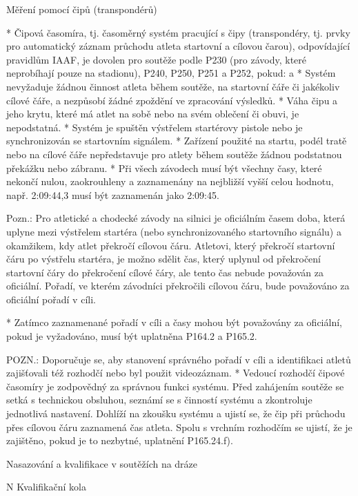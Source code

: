 Měření pomocí čipů (transpondérů)

* Čipová časomíra, tj. časoměrný systém pracující s čipy (transpondéry, tj. prvky pro automatický záznam průchodu atleta startovní a cílovou čarou), odpovídající pravidlům IAAF, je dovolen pro soutěže podle P230 (pro závody, které neprobíhají pouze na stadionu), P240, P250, P251 a P252, pokud:
  \begitems \style a
  * Systém nevyžaduje žádnou činnost atleta během soutěže, na startovní čáře či jakékoliv cílové čáře, a nezpůsobí žádné zpoždění ve zpracování výsledků.
  * Váha čipu a jeho krytu, které má atlet na sobě nebo na svém oblečení či obuvi, je nepodstatná.
  * Systém je spuštěn výstřelem startérovy pistole nebo je synchronizován se startovním signálem.
  * Zařízení použité na startu, podél tratě nebo na cílové čáře nepředstavuje pro atlety během soutěže žádnou podstatnou překážku nebo zábranu.
  * Při všech závodech musí být všechny časy, které nekončí nulou, zaokrouhleny a zaznamenány na nejbližší vyšší celou hodnotu, např. 2:09:44,3 musí být zaznamenán jako 2:09:45.

  Pozn.: Pro atletické a chodecké závody na silnici je oficiálním časem doba, která uplyne mezi výstřelem startéra (nebo synchronizovaného startovního signálu) a okamžikem, kdy atlet překročí cílovou čáru. Atletovi, který překročí startovní čáru po výstřelu startéra, je možno sdělit čas, který uplynul od překročení startovní čáry do překročení cílové čáry, ale tento čas nebude považován za oficiální. Pořadí, ve kterém závodníci překročili cílovou čáru, bude považováno za oficiální pořadí v cíli.

  * Zatímco zaznamenané pořadí v cíli a časy mohou být považovány za oficiální, pokud je vyžadováno, musí být uplatněna  P164.2 a P165.2.

  POZN.: Doporučuje se, aby stanovení správného pořadí v cíli a identifikaci atletů zajišťovali též rozhodčí nebo byl použit videozáznam.
  \enditems
* Vedoucí rozhodčí čipové časomíry je zodpovědný za správnou funkci systému. Před zahájením soutěže se setká s technickou obsluhou, seznámí se s činností systému a zkontroluje jednotlivá nastavení.  Dohlíží na zkoušku systému a ujistí se, že čip při průchodu přes cílovou čáru zaznamená čas atleta. Spolu s vrchním rozhodčím se ujistí, že je  zajištěno, pokud je to nezbytné, uplatnění P165.24.f).
\enditems

\secc Nasazování a kvalifikace v soutěžích na dráze

\begitems \style N
Kvalifikační kola

